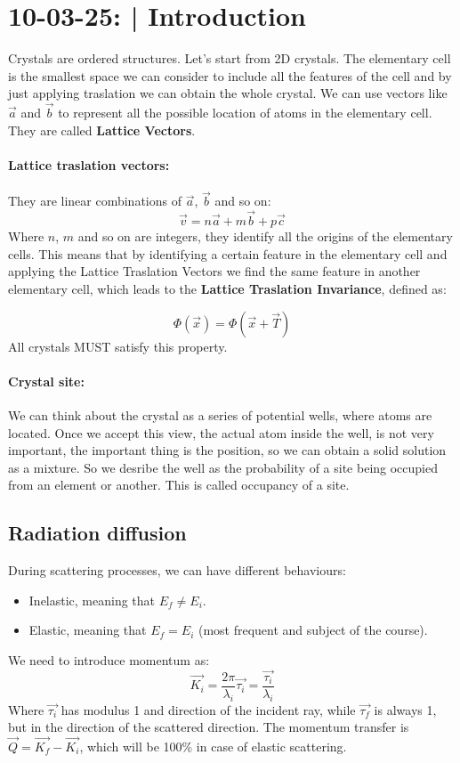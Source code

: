 \section{10-03-25: | Introduction}
Crystals are ordered structures. Let's start from 2D crystals. The elementary cell is the smallest space we can consider to include all the features of the cell and by just applying traslation we can obtain the whole crystal. We can use vectors like $\vec{a}$ and $\vec{b}$ to represent all the possible location of atoms in the elementary cell. They are called \textbf{Lattice Vectors}.

\paragraph{Lattice traslation vectors:} They are linear combinations of $\vec{a}$, $\vec{b}$ and so on:
\begin{equation}
    \vec{v} = n\vec{a} + m\vec{b} + p\vec{c}
\end{equation}
Where $n$, $m$ and so on are integers, they identify all the origins of the elementary cells.
This means that by identifying a certain feature in the elementary cell and applying the Lattice Traslation Vectors we find the same feature in another elementary cell, which leads to the \textbf{Lattice Traslation Invariance}, defined as:

\begin{equation}
    \Phi(\vec{x}) = \Phi(\vec{x} + \vec{T})
\end{equation}
All crystals MUST satisfy this property.

\paragraph{Crystal site:} We can think about the crystal as a series of potential wells, where atoms are located. Once we accept this view, the actual atom inside the well, is not very important, the important thing is the position, so we can obtain a solid solution as a mixture. So we desribe the well as the probability of a site being occupied from an element or another. This is called occupancy of a site.

\subsection{Radiation diffusion}
During scattering processes, we can have different behaviours:
\begin{itemize}
    \item Inelastic, meaning that $E_f \neq E_i$.
    \item Elastic, meaning that $E_f = E_i$ (most frequent and subject of the course).
\end{itemize}
We need to introduce momentum as:
\begin{equation}
    \vec{K_i} = \frac{2\pi}{\lambda_i}\vec{\tau_i} = \frac{\vec{\tau_i}}{\lambda_i}
\end{equation}
Where $\vec{\tau_i}$ has modulus 1 and direction of the incident ray, while $\vec{\tau_f}$ is always 1, but in the direction of the scattered direction. The momentum transfer is $\vec{Q} = \vec{K_f} - \vec{K_i}$, which will be 100\% in case of elastic scattering.

